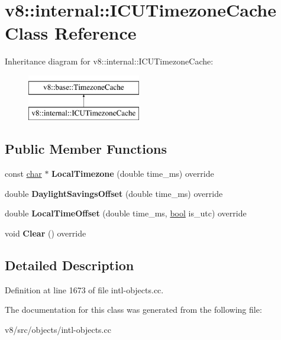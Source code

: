 \hypertarget{classv8_1_1internal_1_1ICUTimezoneCache}{}\section{v8\+:\+:internal\+:\+:I\+C\+U\+Timezone\+Cache Class Reference}
\label{classv8_1_1internal_1_1ICUTimezoneCache}
Inheritance diagram for v8\+:\+:internal\+:\+:I\+C\+U\+Timezone\+Cache\+:\begin{figure}[H]
\begin{center}
\leavevmode
\includegraphics[height=2.000000cm]{classv8_1_1internal_1_1ICUTimezoneCache}
\end{center}
\end{figure}
\subsection*{Public Member Functions}
\begin{DoxyCompactItemize}
\item 
\mbox{\label{classv8_1_1internal_1_1ICUTimezoneCache_ac69ff0adf27bffd005e0a91975809c4f}} 
const \mbox{\hyperlink{classchar}{char}} $\ast$ {\bfseries Local\+Timezone} (double time\+\_\+ms) override
\item 
\mbox{\label{classv8_1_1internal_1_1ICUTimezoneCache_a28e8e649d26072ec06d1b3b0147eaee1}} 
double {\bfseries Daylight\+Savings\+Offset} (double time\+\_\+ms) override
\item 
\mbox{\label{classv8_1_1internal_1_1ICUTimezoneCache_ae21dbc103eae2d4ee225d6c68c9667c8}} 
double {\bfseries Local\+Time\+Offset} (double time\+\_\+ms, \mbox{\hyperlink{classbool}{bool}} is\+\_\+utc) override
\item 
\mbox{\label{classv8_1_1internal_1_1ICUTimezoneCache_adf8470839855363e9db514bcb1cad641}} 
void {\bfseries Clear} () override
\end{DoxyCompactItemize}


\subsection{Detailed Description}


Definition at line 1673 of file intl-\/objects.\+cc.



The documentation for this class was generated from the following file\+:\begin{DoxyCompactItemize}
\item 
v8/src/objects/intl-\/objects.\+cc\end{DoxyCompactItemize}
